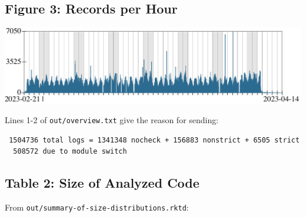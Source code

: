 \documentclass{article}
\begin{document}
\newcommand{\modefont}[1]{\texttt{#1}}
\newcommand{\mnocheck}{\modefont{nocheck}}
\newcommand{\mnonstrict}{\modefont{nonstrict}}
\newcommand{\mstrict}{\modefont{strict}}

\subsection*{Figure 3: Records per Hour}

\includegraphics[width=\columnwidth]{out/row-distribution.pdf}

Lines 1-2 of \texttt{out/overview.txt} give the reason for sending:

\begin{verbatim}
 1504736 total logs = 1341348 nocheck + 156883 nonstrict + 6505 strict
  508572 due to module switch
\end{verbatim}


\subsection*{Table 2: Size of Analyzed Code}

From \texttt{out/summary-of-size-distributions.rktd}:

{\footnotesize

}
\end{document}
